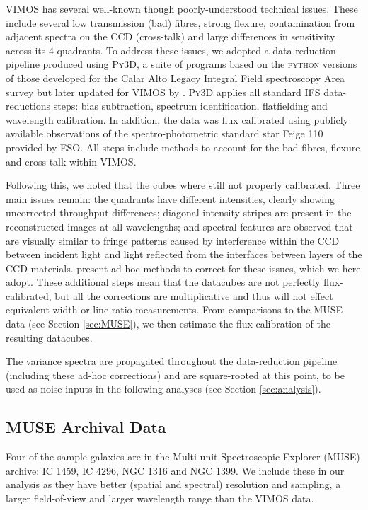 \documentclass[fleqn,usenatbib,useAMS]{mnras}
\begin{document}


	VIMOS has several well-known though poorly-understood technical issues. These include several low transmission (bad) fibres, strong flexure, contamination from adjacent spectra on the CCD (cross-talk) and large differences in sensitivity across its 4 quadrants. To address these issues, we adopted a data-reduction pipeline produced using \textsc{Py3D}, a suite of programs based on the \textsc{python} versions of those developed for the Calar Alto Legacy Integral Field spectroscopy Area survey \citep[CALIFA;][]{Sanchez2012, Husemann2013} but later updated for VIMOS by \citet{Husemann2014}. \textsc{Py3D} applies all standard IFS data-reductions steps: bias subtraction, spectrum identification, flatfielding and wavelength calibration. In addition, the data was flux calibrated using publicly available observations of the spectro-photometric standard star Feige 110 provided by ESO. All steps include methods to account for the bad fibres, flexure and cross-talk within VIMOS. 

	Following this, we noted that the cubes where still not properly calibrated. Three main issues remain: the quadrants have different intensities, clearly showing uncorrected throughput differences; diagonal intensity stripes are present in the reconstructed images at all wavelengths; and spectral features are observed \citep{Jullo2008} that are visually similar to fringe patterns caused by interference within the CCD between incident light and light reflected from the interfaces between layers of the CCD materials. \citet{Lagerholm2012} present ad-hoc methods to correct for these issues, which we here adopt. These additional steps mean that the datacubes are not perfectly flux-calibrated, but all the corrections are multiplicative and thus will not effect equivalent width or line ratio measurements. From comparisons to the MUSE data (see Section \ref{sec:MUSE}), we then estimate the flux calibration of the resulting datacubes. 

	The variance spectra are propagated throughout the data-reduction pipeline (including these ad-hoc corrections) and are square-rooted at this point, to be used as noise inputs in the following analyses (see Section \ref{sec:analysis}).


	\subsection{MUSE Archival Data}
		\label{subsec:MUSE}
		Four of the sample galaxies are in the Multi-unit Spectroscopic Explorer (MUSE) archive: IC 1459, IC 4296, NGC 1316 and NGC 1399. We include these in our analysis as they have better (spatial and spectral) resolution and sampling, a larger field-of-view and larger wavelength range than the VIMOS data. 
\end{document}

